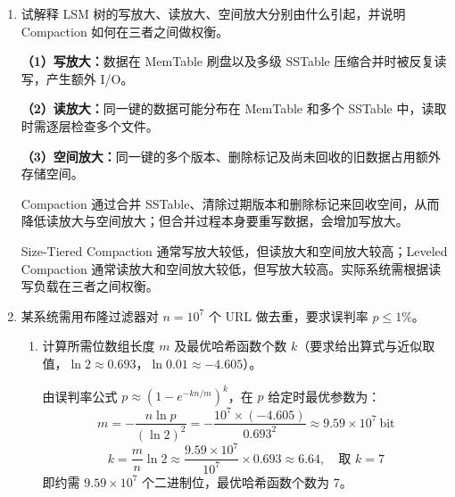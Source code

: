 \documentclass[UTF8,a4paper,11pt]{ctexart}
\newenvironment{answer}%
  {\begin{ans}\noindent{\bfseries\color{ansframe}【答案】}\hspace{0.4em}}%
  {\end{ans}}
\begin{document}
\begin{enumerate}
\begin{answer}
\medskip
\noindent\textbf{卷面可写（英文简答）}
\begin{quote}\small
① Delete 19: $[19,20,22]\rightarrow[20,22]$; no underflow; update the root separator from 19 to 20.\par
② Delete 20: $[20,22]\rightarrow[22]$; underflow; merge with the right sibling to obtain $[22,24,27,29]$. The parent internal node then underflows; merge the internal nodes and remove the old root, reducing the tree height. The new root is [5, 14, 22, 33].\par
③ Delete 24: $[22,24,27,29]\rightarrow[22,27,29]$; no underflow.\par
Final: root [5, 14, 22, 33]; leaves $[2,3]\rightarrow[5,7,8]\rightarrow[14,16,17]\rightarrow[22,27,29]\rightarrow[33,34,38,39]$.
\end{quote}
说明：删除 20 时也可以先向右兄弟借用 24，而不立即合并；这样在随后删除 24 时该叶节点会再次下溢并触发合并，最终仍得到上述根节点和叶节点。两种路线在允许借用/合并的教材规则下都成立。
\end{answer}

\item 试解释 LSM 树的写放大、读放大、空间放大分别由什么引起，并说明 Compaction 如何在三者之间做权衡。
\begin{answer}
\textbf{（1）写放大：}数据在 MemTable 刷盘以及多级 SSTable 压缩合并时被反复读写，产生额外 I/O。\par
\textbf{（2）读放大：}同一键的数据可能分布在 MemTable 和多个 SSTable 中，读取时需逐层检查多个文件。\par
\textbf{（3）空间放大：}同一键的多个版本、删除标记及尚未回收的旧数据占用额外存储空间。\par
Compaction 通过合并 SSTable、清除过期版本和删除标记来回收空间，从而降低读放大与空间放大；但合并过程本身要重写数据，会增加写放大。\par
Size-Tiered Compaction 通常写放大较低，但读放大和空间放大较高；Leveled Compaction 通常读放大和空间放大较低，但写放大较高。实际系统需根据读写负载在三者之间权衡。
\end{answer}

\item 某系统需用布隆过滤器对 $n=10^{7}$ 个 URL 做去重，要求误判率 $p \leq 1\%$。
\begin{enumerate}
\item 计算所需位数组长度 $m$ 及最优哈希函数个数 $k$（要求给出算式与近似取值，$\ln 2 \approx 0.693$，$\ln 0.01 \approx -4.605$）。
\begin{answer}
由误判率公式 $p \approx \left(1-e^{-kn/m}\right)^{k}$，在 $p$ 给定时最优参数为：
\[
m = -\frac{n\ln p}{(\ln 2)^{2}} = -\frac{10^{7}\times(-4.605)}{0.693^{2}} \approx 9.59\times 10^{7}\ \text{bit}
\]
\[
k = \frac{m}{n}\ln 2 \approx \frac{9.59\times 10^{7}}{10^{7}}\times 0.693 \approx 6.64,\quad \text{取 } k=7
\]
即约需 $9.59\times 10^{7}$ 个二进制位，最优哈希函数个数为 7。
\end{answer}


\end{enumerate}
\end{enumerate}
\end{document}
